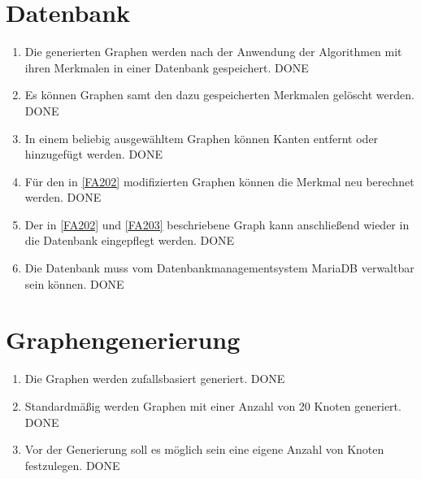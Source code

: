\documentclass[13pt]{scrreprt}
\newcounter{tempcounter1}
\newcounter{tempcounter2}
\newcounter{tempcounter3}
\newcounter{tempcounter4}
\newcounter{tempcounter5}
\newcounter{tempcounter6}
\newcounter{tempcounter7}
\newcounter{tempcounter8}
\newcounter{tempcounter9}
\begin{document}
\section{Datenbank}
\begin{addmargin}[25pt]{0pt}
	\begin{enumerate} [label=FA\arabic*,start=200]
		\item \label{FA200}Die generierten Graphen werden nach der Anwendung der Algorithmen mit ihren Merkmalen in einer Datenbank gespeichert. DONE
		\item \label{FA201}Es können Graphen samt den dazu gespeicherten Merkmalen gelöscht werden. DONE
		\item \label{FA202}In einem beliebig ausgewähltem Graphen können Kanten entfernt oder hinzugefügt werden. DONE
		\item \label{FA203}Für den in \ref{FA202} modifizierten Graphen können die Merkmal neu berechnet werden. DONE
		\item \label{FA204}Der in \ref{FA202} und \ref{FA203} beschriebene Graph kann anschließend wieder in die Datenbank eingepflegt werden. DONE
		\item \label{FA205}Die Datenbank muss vom Datenbankmanagementsystem MariaDB verwaltbar sein können. DONE
		\setcounter{tempcounter4}{\value{enumi}}
	\end{enumerate}
\end{addmargin}

\section{Graphengenerierung}
\begin{addmargin}[25pt]{0pt}
	\begin{enumerate} [label=FA\arabic*,start=300]
		\item \label{FA300}Die Graphen werden zufallsbasiert generiert. DONE
		\item Standardmäßig werden Graphen mit einer Anzahl von 20 Knoten generiert. DONE
		\item Vor der Generierung soll es möglich sein eine eigene Anzahl von Knoten festzulegen. DONE
		\setcounter{tempcounter5}{\value{enumi}}
	\end{enumerate}
\end{addmargin}
\end{document}
